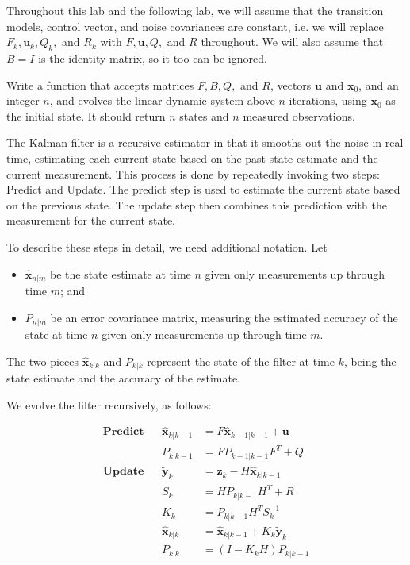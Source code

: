 Throughout this lab and the following lab, we will assume that the transition models, control vector, and noise covariances are constant, i.e. we will replace $F_{k}, \mathbf{u}_{k}, Q_{k},$ and $R_{k}$ with $F, \mathbf{u}, Q,$ and $R$ throughout. We will also assume that $B = I$ is the identity matrix, so it too can be ignored.

\begin{problem}
Write a function that accepts matrices $F, B, Q,$ and $R$, vectors $\mathbf{u}$ and $\mathbf{x}_{0}$, and an integer $n$, and evolves the linear dynamic system above $n$ iterations, using $\mathbf{x}_{0}$ as the initial state. It should return $n$ states and $n$ measured observations.
\end{problem}

The Kalman filter is a recursive estimator in that it smooths out the noise in real time, estimating each current state based on the past state estimate and the current measurement. This process is done by repeatedly invoking two steps: Predict and Update. The predict step is used to estimate the current state based on the previous state. The update step then combines this prediction with the measurement for the current state.

To describe these steps in detail, we need additional notation. Let 
\begin{itemize}
	\item $\widehat{\mathbf{x}}_{n|m}$ be the state estimate at time $n$ given only measurements up through time $m$; and
	\item $P_{n|m}$ be an error covariance matrix, measuring the estimated accuracy of the state at time $n$ given only measurements up through time $m$.
\end{itemize}

The two pieces $\widehat{\mathbf{x}}_{k|k}$ and $P_{k|k}$ represent the state of the filter at time $k$, being the state estimate and the accuracy of the estimate.

We evolve the filter recursively, as follows:

\begin{align*}
\textbf{Predict} & & \widehat{\mathbf{x}}_{k|k-1} & = F\widehat{\mathbf{x}}_{k-1|k-1} + \mathbf{u} \\
 & & P_{k|k-1} & = FP_{k-1|k-1}F^{T} + Q \\
\textbf{Update} & & \tilde{\mathbf{y}}_{k} & = \mathbf{z}_{k} - H\widehat{\mathbf{x}}_{k|k-1} \\
 & & S_{k} & = HP_{k|k-1}H^{T} + R \\
 & & K_{k} & = P_{k|k-1}H^{T}S_{k}^{-1} \\
 & & \widehat{\mathbf{x}}_{k|k} & = \widehat{\mathbf{x}}_{k|k-1} + K_{k}\tilde{\mathbf{y}}_{k} \\
 & & P_{k|k} & = (I - K_{k}H)P_{k|k-1}
\end{align*}

